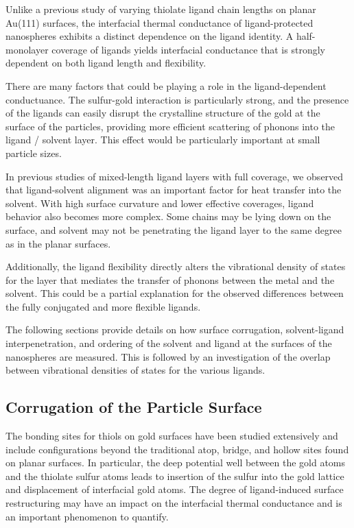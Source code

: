Unlike a previous study of varying thiolate ligand chain lengths on
planar Au(111) surfaces, the interfacial thermal conductance of
ligand-protected nanospheres exhibits a distinct dependence on the
ligand identity.\cite{Stocker:2013cl} A half-monolayer coverage of ligands yields
interfacial conductance that is strongly dependent on both ligand
length and flexibility.

There are many factors that could be playing a role in the
ligand-dependent conductuance.  The sulfur-gold interaction is
particularly strong, and the presence of the ligands can easily
disrupt the crystalline structure of the gold at the surface of the
particles, providing more efficient scattering of phonons into the
ligand / solvent layer. This effect would be particularly important at
small particle sizes.

In previous studies of mixed-length ligand layers with full coverage,
we observed that ligand-solvent alignment was an important factor for
heat transfer into the solvent.  With high surface curvature and lower
effective coverages, ligand behavior also becomes more complex. Some
chains may be lying down on the surface, and solvent may not be
penetrating the ligand layer to the same degree as in the planar
surfaces.  

Additionally, the ligand flexibility directly alters the vibrational
density of states for the layer that mediates the transfer of phonons
between the metal and the solvent. This could be a partial explanation
for the observed differences between the fully conjugated and more
flexible ligands.

The following sections provide details on how
surface corrugation, solvent-ligand interpenetration, and
ordering of the solvent and ligand at the surfaces of the
nanospheres are measured. This is followed by an investigation of 
the overlap between vibrational densities of states for the various ligands.

\subsection{Corrugation of the Particle Surface}

The bonding sites for thiols on gold surfaces have been studied
extensively and include configurations beyond the traditional atop,
bridge, and hollow sites found on planar surfaces. In particular, the
deep potential well between the gold atoms and the thiolate sulfur
atoms leads to insertion of the sulfur into the gold lattice and
displacement of interfacial gold atoms. The degree of ligand-induced
surface restructuring may have an impact on the interfacial thermal
conductance and is an important phenomenon to quantify.

